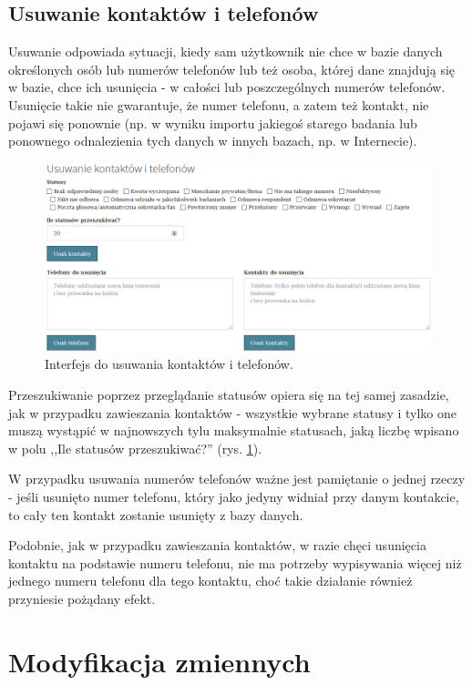 \documentclass[12pt, twoside, hidelinks]{report}
\begin{document}
\section{Usuwanie kontaktów i telefonów}
Usuwanie odpowiada sytuacji, kiedy sam użytkownik nie chce w bazie danych określonych osób lub numerów telefonów lub też osoba, której dane znajdują się w bazie, chce ich usunięcia - w całości lub poszczególnych numerów telefonów. Usunięcie takie nie gwarantuje, że numer telefonu, a zatem też kontakt, nie pojawi się ponownie (np. w wyniku importu jakiegoś starego badania lub ponownego odnalezienia tych danych w innych bazach, np. w Internecie). \par
\begin{figure}[h!]
\includegraphics[width = 1\textwidth]{2.5.}
\centering
\caption{Interfejs do usuwania kontaktów i telefonów.}
\label{usuwanie_kontaktow_telefonow_interfejs}
\end{figure}
Przeszukiwanie poprzez przeglądanie statusów opiera się na tej samej zasadzie, jak w przypadku zawieszania kontaktów - wszystkie wybrane statusy i tylko one muszą wystąpić w najnowszych tylu maksymalnie statusach, jaką liczbę wpisano w polu ,,Ile statusów przeszukiwać?'' (rys. \ref{usuwanie_kontaktow_telefonow_interfejs}). \par
W przypadku usuwania numerów telefonów ważne jest pamiętanie o jednej rzeczy - jeśli usunięto numer telefonu, który jako jedyny widniał przy danym kontakcie, to cały ten kontakt zostanie usunięty z bazy danych. \par
Podobnie, jak w przypadku zawieszania kontaktów, w razie chęci usunięcia kontaktu na podstawie numeru telefonu, nie ma potrzeby wypisywania więcej niż jednego numeru telefonu dla tego kontaktu, choć takie działanie również przyniesie pożądany efekt.
\chapter{Modyfikacja zmiennych}
\thispagestyle{empty}
\pagebreak
\end{document}
